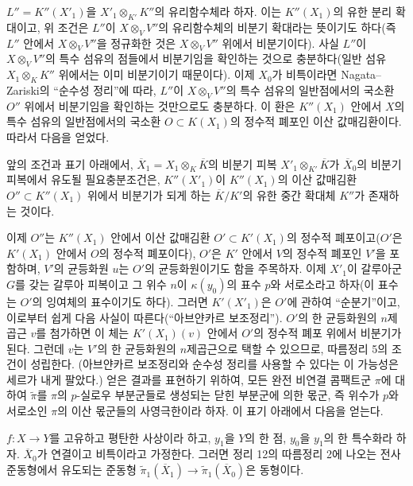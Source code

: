 $L''=K''(X'_1)$을 $X'_1\otimes_{K'}K''$의 유리함수체라 하자. 이는
$K''(X_1)$의 유한 분리 확대이고, 위 조건은 $L''$이
$X\otimes_VV''$의 유리함수체의 비분기 확대라는 뜻이기도 하다(즉
$L''$ 안에서 $X\otimes_VV''$을 정규화한 것은 $X\otimes_VV''$ 위에서
비분기이다). 사실 $L''$이 $X\otimes_VV''$의 특수 섬유의 점들에서
비분기임을 확인하는 것으로 충분하다(일반 섬유
$X_1\otimes_KK''$ 위에서는 이미 비분기이기 때문이다). 이제 $X_0$가
비특이라면 Nagata--Zariski의 ``순수성 정리''에 따라, $L''$이
$X\otimes_VV''$의 특수 섬유의 일반점에서의 국소환 $O''$ 위에서
비분기임을 확인하는 것만으로도 충분하다. 이 환은
$K''(X_1)$ 안에서 $X$의 특수 섬유의 일반점에서의 국소환
$O\subset K(X_1)$의 정수적 폐포인 이산 값매김환이다. 따라서 다음을
얻었다.

 앞의 조건과 표기 아래에서,
$\overline X_1=X_1\otimes_K\overline K$의 비분기 피복
$X'_1\otimes_{K'}\overline K$가 $\overline X_0$의 비분기 피복에서
유도될 필요충분조건은, $K''(X'_1)$이
$K''(X_1)$의 이산 값매김환 $O''\subset K''(X_1)$ 위에서 비분기가
되게 하는 $\overline K/K'$의 유한 중간 확대체 $K''$가 존재하는 것이다.

이제 $O''$는 $K''(X_1)$ 안에서 이산 값매김환
$O'\subset K'(X_1)$의 정수적 폐포이고($O'$은 $K'(X_1)$ 안에서
$O$의 정수적 폐포이다), $O'$은 $K'$ 안에서 $V$의 정수적 폐포인
$V'$을 포함하며, $V'$의 균등화원 $u$는 $O'$의 균등화원이기도 함을
주목하자. 이제 $X'_1$이 갈루아군 $G$를 갖는 갈루아 피복이고 그 위수
$n$이 $\kappa(y_0)$의 표수 $p$와 서로소라고 하자(이 표수는 $O'$의
잉여체의 표수이기도 하다). 그러면 $K'(X'_1)$은 $O'$에 관하여
``순분기''이고, 이로부터 쉽게 다음 사실이 따른다(``아브얀카르
보조정리''). $O'$의 한 균등화원의 $n$제곱근 $v$를 첨가하면 이 체는
$K'(X_1)(v)$ 안에서 $O'$의 정수적 폐포 위에서 비분기가 된다. 그런데
$v$는 $V'$의 한 균등화원의 $n$제곱근으로 택할 수 있으므로,
따름정리 5의 조건이 성립한다. (아브얀카르 보조정리와 순수성 정리를
사용할 수 있다는 이 가능성은 세르가 내게 팔았다.) 얻은 결과를
표현하기 위하여, 모든 완전 비연결 콤팩트군 $\pi$에 대하여
$\widetilde\pi$를 $\pi$의 $p$-실로우 부분군들로 생성되는 닫힌 부분군에
의한 몫군, 즉 위수가 $p$와 서로소인 $\pi$의 이산 몫군들의 사영극한이라
하자. 이 표기 아래에서 다음을 얻는다.

 $f:X\longrightarrow Y$를 고유하고 평탄한 사상이라
하고, $y_1$을 $Y$의 한 점, $y_0$을 $y_1$의 한 특수화라 하자.
$\overline X_0$가 연결이고 비특이라고 가정한다. 그러면 정리 12의
따름정리 2에 나오는 전사 준동형에서 유도되는 준동형
$\widetilde\pi_1(\overline X_1)\longrightarrow
\widetilde\pi_1(\overline X_0)$은 동형이다.

